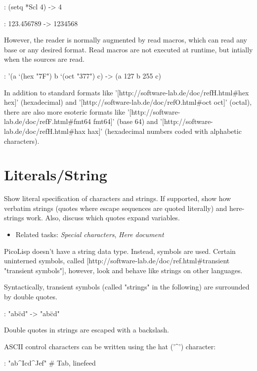 \begin{itemize}
\begin{wideverbatim}
: (setq *Scl 4)
-> 4

: 123.456789
-> 1234568

However, the reader is normally augmented by read macros, which can read any
base or any desired format. Read macros are not executed at runtime, but
intially when the sources are read.

: '(a `(hex "7F") b `(oct "377") c)
-> (a 127 b 255 c)

In addition to standard formats like
'[http://software-lab.de/doc/refH.html#hex hex]' (hexadecimal) and
'[http://software-lab.de/doc/refO.html#oct oct]' (octal),
there are also more esoteric formats like
'[http://software-lab.de/doc/refF.html#fmt64 fmt64]' (base 64) and
'[http://software-lab.de/doc/refH.html#hax hax]' (hexadecimal numbers
coded with alphabetic characters).

\end{wideverbatim}

\pagebreak{}
\section*{Literals/String}


Show literal specification of characters and strings. If supported, show
how verbatim strings (quotes where escape sequences are quoted
literally) and here-strings work. Also, discuss which quotes expand
variables.

\begin{itemize}
\item
  Related tasks: \emph{Special characters},
  \emph{Here document}
\end{itemize}



\begin{wideverbatim}

PicoLisp doesn't have a string data type. Instead, symbols are used. Certain
uninterned symbols, called
[http://software-lab.de/doc/ref.html#transient "transient symbols"],
however, look and behave like strings on other languages.

Syntactically, transient symbols (called "strings" in the following)  are
surrounded by double quotes.

: "ab\"cd"
-> "ab\"cd"

Double quotes in strings are escaped with a backslash.

ASCII control characters can be written using the hat ('^') character:

: "ab^Icd^Jef"  # Tab, linefeed


\end{wideverbatim}
\end{itemize}
